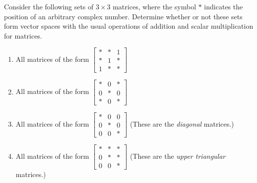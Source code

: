 %
Consider the following sets of $3 \times 3$ matrices, where the symbol $*$ indicates the position of an arbitrary complex number.  Determine whether or not these sets form vector spaces with the usual operations of addition and scalar multiplication for matrices. 
\begin{enumerate} 
\item All matrices of the form $\begin{bmatrix} * & * & 1\\ * & 1 & *\\ 1 & * & * \end{bmatrix}$
\item All matrices of the form $\begin{bmatrix} * & 0 & *\\ 0 & * & 0\\ * & 0 & * \end{bmatrix}$
\item All matrices of the form $\begin{bmatrix} * & 0 & 0\\ 0 & * & 0\\ 0 & 0 & * \end{bmatrix}$ 
(These are the {\it{diagonal}} matrices.)
\item All matrices of the form $\begin{bmatrix} * & * & *\\ 0 & * & *\\ 0 & 0 & * \end{bmatrix}$ 
(These are the {\it{upper triangular}} matrices.)
\end{enumerate}